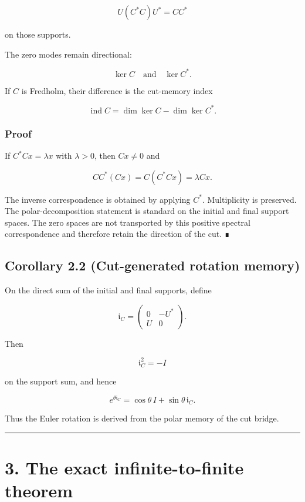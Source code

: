 \[
U(C^*C)U^*=CC^*
\]

on those supports.

The zero modes remain directional:

\[
\ker C
\quad\text{and}\quad
\ker C^*.
\]

If \(C\) is Fredholm, their difference is the cut-memory index

\[
\boxed{
\operatorname{ind}C
=
\dim\ker C-\dim\ker C^*.
}
\]

\hypertarget{proof}{%
\subsubsection{Proof}\label{proof}}

If \(C^*Cx=\lambda x\) with \(\lambda>0\), then \(Cx\neq0\) and

\[
CC^*(Cx)=C(C^*Cx)=\lambda Cx.
\]

The inverse correspondence is obtained by applying \(C^*\). Multiplicity is
preserved. The polar-decomposition statement is standard on the initial and
final support spaces. The zero spaces are not transported by this positive
spectral correspondence and therefore retain the direction of the cut. ∎

\hypertarget{corollary-2.2-cut-generated-rotation-memory}{%
\subsection{Corollary 2.2 (Cut-generated rotation memory)}\label{corollary-2.2-cut-generated-rotation-memory}}

On the direct sum of the initial and final supports, define

\[
\mathfrak i_C
=
\begin{pmatrix}
0&-U^*\\
U&0
\end{pmatrix}.
\]

Then

\[
\boxed{
\mathfrak i_C^2=-I
}
\]

on the support sum, and hence

\[
\boxed{
e^{\theta\mathfrak i_C}
=
\cos\theta\,I+\sin\theta\,\mathfrak i_C.
}
\]

Thus the Euler rotation is derived from the polar memory of the cut bridge.

\begin{center}\rule{0.5\linewidth}{0.5pt}\end{center}

\hypertarget{the-exact-infinite-to-finite-theorem}{%
\section{3. The exact infinite-to-finite theorem}\label{the-exact-infinite-to-finite-theorem}}

